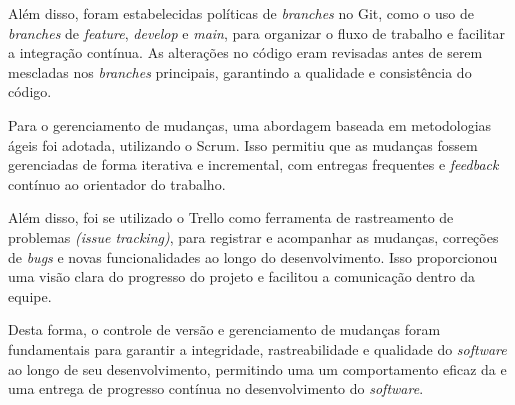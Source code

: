 Além disso, foram estabelecidas políticas de \textit{branches} no Git, como o uso de \textit{branches} de \textit{feature}, \textit{develop} e \textit{main}, para organizar o fluxo de trabalho e facilitar a integração contínua. As alterações no código eram revisadas antes de serem mescladas nos \textit{branches} principais, garantindo a qualidade e consistência do código.
    
Para o gerenciamento de mudanças, uma abordagem baseada em metodologias ágeis foi adotada, utilizando o Scrum. Isso permitiu que as mudanças fossem gerenciadas de forma iterativa e incremental, com entregas frequentes e \textit{feedback} contínuo ao orientador do trabalho.
    
Além disso, foi se utilizado o Trello como ferramenta de rastreamento de problemas \textit{(issue tracking)}, para registrar e acompanhar as mudanças, correções de \textit{bugs} e novas funcionalidades ao longo do desenvolvimento. Isso proporcionou uma visão clara do progresso do projeto e facilitou a comunicação dentro da equipe.
    
Desta forma, o controle de versão e gerenciamento de mudanças foram fundamentais para garantir a integridade, rastreabilidade e qualidade do \textit{software} ao longo de seu desenvolvimento, permitindo uma um comportamento eficaz da e uma entrega de progresso contínua no desenvolvimento do \textit{software}.